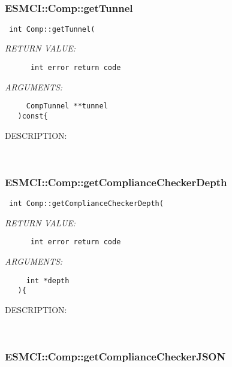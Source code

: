    
 
\mbox{}\hrulefill\
 
\subsubsection [ESMCI::Comp::getTunnel] {ESMCI::Comp::getTunnel}


  
\begin{verbatim} int Comp::getTunnel(\end{verbatim}{\em RETURN VALUE:}
\begin{verbatim}      int error return code\end{verbatim}{\em ARGUMENTS:}
\begin{verbatim}     CompTunnel **tunnel
   )const{\end{verbatim}
{\sf DESCRIPTION:\\ }


   
 
\mbox{}\hrulefill\
 
\subsubsection [ESMCI::Comp::getComplianceCheckerDepth] {ESMCI::Comp::getComplianceCheckerDepth}


  
\begin{verbatim} int Comp::getComplianceCheckerDepth(\end{verbatim}{\em RETURN VALUE:}
\begin{verbatim}      int error return code\end{verbatim}{\em ARGUMENTS:}
\begin{verbatim}     int *depth
   ){\end{verbatim}
{\sf DESCRIPTION:\\ }


   
 
\mbox{}\hrulefill\
 
\subsubsection [ESMCI::Comp::getComplianceCheckerJSON] {ESMCI::Comp::getComplianceCheckerJSON}


